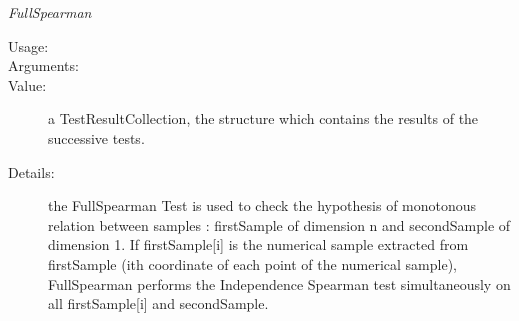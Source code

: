 \begin{description}
\begin{description}
\item \textit{FullSpearman}
\begin{description}
\item[Usage:] \rule{0pt}{1em}
\item[Arguments:] \rule{0pt}{1em}
\item[Value:]  a TestResultCollection, the structure which contains the results of the successive tests.
\item[Details:] the FullSpearman Test is used to check the hypothesis of monotonous relation between samples : firstSample of dimension n and secondSample of dimension 1. If firstSample[i] is the numerical sample extracted from firstSample (ith coordinate of each point of the numerical sample), FullSpearman performs the Independence Spearman test simultaneously on all firstSample[i] and secondSample.
\end{description}
\bigskip


\end{description}
\end{description}
